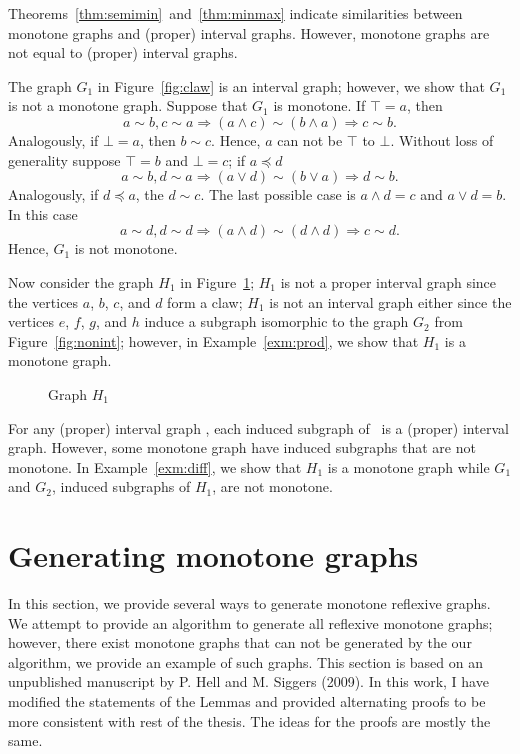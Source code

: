 Theorems~\ref{thm:semimin}~and~\ref{thm:minmax} indicate similarities between
monotone graphs and (proper) interval graphs. However, monotone graphs are not
equal to (proper) interval graphs.

\begin{example} \label{exm:diff}
The graph \(G_1\) in Figure~\ref{fig:claw} is an interval graph; however, we show that \(G_1\) is not a monotone graph.
Suppose that \(G_1\) is monotone. If \(\top = a\), then
\[a \sim b, c \sim a \Rightarrow (a \wedge c) \sim (b \wedge a) \Rightarrow c \sim b.\]
Analogously, if \(\bot = a\), then \(b \sim c\)\@. Hence, \(a\) can not be \(\top\) to \(\bot\)\@.
Without loss of generality suppose \(\top = b\) and \(\bot = c\); if \(a \preceq d\)
\[a \sim b, d \sim a \Rightarrow (a \vee d) \sim (b \vee a) \Rightarrow d \sim b.\]
Analogously, if \(d \preceq a\), the \(d \sim c\)\@. The last possible case is 
\(a \wedge d = c\) and \(a \vee d = b\). In this case
\[a \sim d, d \sim d \Rightarrow (a \wedge d) \sim (d \wedge d) \Rightarrow c \sim d.\]
Hence, \(G_1\) is not monotone. 

Now consider the graph \(H_1\) in Figure~\ref{fig:monnotpint};
\(H_1\) is not a proper interval graph since the vertices \(a\), \(b\), \(c\), and \(d\) form a claw;
\(H_1\) is not an interval graph either since the vertices \(e\), \(f\), \(g\), and \(h\) induce a subgraph isomorphic to the graph \(G_2\)
from Figure~\ref{fig:nonint}; however, in Example~\ref{exm:prod},
we show that \(H_1\) is a monotone graph.

\begin{figure}[h]
\center

\caption{Graph \ensuremath{H_1}} \label{fig:monnotpint}
\end{figure}
\end{example}

For any (proper) interval graph \mH, each induced subgraph of \mH\ is a 
(proper) interval graph. However, some monotone graph have induced subgraphs that are not monotone.
In Example~\ref{exm:diff}, we show that \(H_1\) is a monotone graph while \(G_1\) and \(G_2\), induced subgraphs of \(H_1\), are
not monotone.

\section{Generating monotone graphs}
In this section, we provide several ways to generate monotone reflexive graphs.
We attempt to provide an algorithm to generate all reflexive monotone graphs;
however, there exist monotone graphs that can not be generated by the our algorithm,
we provide an example of such graphs. This section is based on an unpublished
manuscript by P. Hell and M. Siggers (2009)\@. In this work, I have modified the
statements of the Lemmas and provided alternating proofs to be more consistent with
rest of the thesis. The ideas for the proofs are mostly the same.

